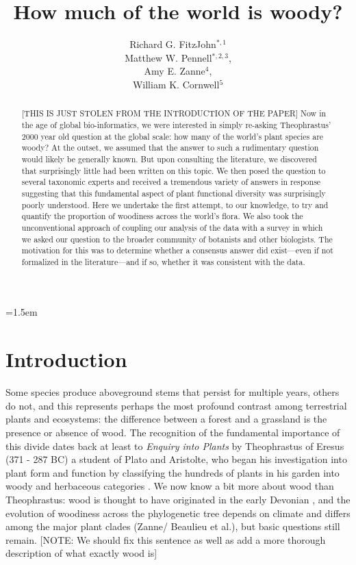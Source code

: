 \documentclass[12pt]{article}
\title{How much of the world is woody?}
\author{
Richard G. FitzJohn$^{*,1}$\\ Matthew W. Pennell$^{*,2,3}$,\\ Amy E. Zanne$^{4}$,\\ William K. Cornwell$^{5}$
}
\date{}
\affiliation{\noindent
$^*$ These authors contributed equally}
\begin{document}
\mstitlepage
\parindent=1.5em
\addtolength{\parskip}{.3em}

\begin{abstract}
[THIS IS JUST STOLEN FROM THE INTRODUCTION OF THE PAPER] Now in the age of global bio-informatics, we were interested in simply re-asking Theophrastus' 2000 year old question at the global scale: how many of the world's plant species are woody? At the outset, we assumed that the answer to such a rudimentary question would likely be generally known. But upon consulting the literature, we discovered that surprisingly little had been written on this topic. We then posed the question to several taxonomic experts and received a tremendous variety of answers in response suggesting that this fundamental aspect of plant functional diversity was surprisingly poorly understood. Here we undertake the first attempt, to our knowledge, to try and quantify the proportion of woodiness across the world's flora. We also took the unconventional approach of coupling our analysis of the data with a survey in which we asked our question to the broader community of botanists and other biologists. The motivation for this was to determine whether a consensus answer did exist---even if not formalized in the literature---and if so, whether it was consistent with the data.
\end{abstract}

\section{Introduction}

Some species produce aboveground stems that persist for multiple years, others do not, and this represents perhaps the most profound contrast among terrestrial plants and ecosystems: the difference between a forest and a grassland is the presence or absence of wood. The recognition of the fundamental importance of this divide dates back at least to \textit{Enquiry into Plants} by Theophrastus of Eresus (371 - 287 BC) a student of Plato and Aristolte, who began his investigation into plant form and function by classifying the hundreds of plants in his garden into woody and herbaceous categories \citep{theophrastus1916enquiry}.  We now know a bit more about wood than Theophrastus: wood is thought to have originated in the early Devonian \citep[~400 mya;][]{gerrienne2011simple}, and the evolution of woodiness across the phylogenetic tree depends on climate and differs among the major plant clades (Zanne/ Beaulieu et al.), but basic questions still remain. [NOTE: We should fix this sentence as well as add a more thorough description of what exactly wood is]
\end{document}
